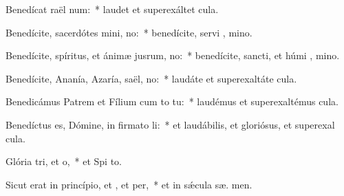 \item Benedícat raël num:~* laudet et superexáltet   cula.
\item Benedícite, sacerdótes mini, no:~* benedícite, servi , mino.
\item Benedícite, spíritus, et ánimæ jusrum, no:~* benedícite, sancti, et húmi , mino.
\item Benedícite, Ananía, Azaría, saël, no:~* laudáte et superexaltáte   cula.
\item Benedicámus Patrem et Fílium cum to tu:~* laudémus et superexaltémus   cula.
\item Benedíctus es, Dómine, in firmato li:~* et laudábilis, et gloriósus, et superexal  cula.
\item Glória tri, et o,~* et Spi to.
\item Sicut erat in princípio, et , et per,~* et in sǽcula sæ. men.

